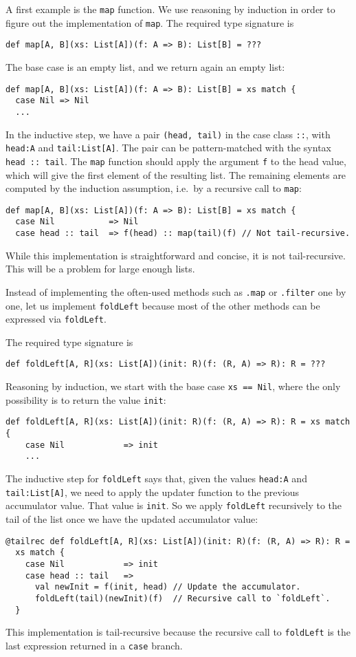 A first example is the \lstinline!map! function. We use reasoning
by induction in order to figure out the implementation of \lstinline!map!.
The required type signature is
\begin{lstlisting}
def map[A, B](xs: List[A])(f: A => B): List[B] = ???
\end{lstlisting}
The base case is an empty list, and we return again an empty list:
\begin{lstlisting}
def map[A, B](xs: List[A])(f: A => B): List[B] = xs match {
  case Nil => Nil
  ...
\end{lstlisting}
In the inductive step, we have a pair \lstinline!(head, tail)! in
the case class \lstinline!::!, with \lstinline!head:A! and \lstinline!tail:List[A]!.
The pair can be pattern-matched with the syntax \lstinline!head :: tail!.
The \lstinline!map! function should apply the argument \lstinline!f!
to the head value, which will give the first element of the resulting
list. The remaining elements are computed by the induction assumption,
i.e.~by a recursive call to \lstinline!map!:
\begin{lstlisting}
def map[A, B](xs: List[A])(f: A => B): List[B] = xs match {
  case Nil           => Nil
  case head :: tail  => f(head) :: map(tail)(f) // Not tail-recursive.
\end{lstlisting}
While this implementation is straightforward and concise, it is not
tail-recursive. This will be a problem for large enough lists.

Instead of implementing the often-used methods such as \lstinline!.map!
or \lstinline!.filter! one by one, let us implement \lstinline!foldLeft!
because most of the other methods can be expressed via \lstinline!foldLeft!. 

The required type signature is
\begin{lstlisting}
def foldLeft[A, R](xs: List[A])(init: R)(f: (R, A) => R): R = ???
\end{lstlisting}
Reasoning by induction, we start with the base case \lstinline!xs == Nil!,
where the only possibility is to return the value \lstinline!init!:
\begin{lstlisting}
def foldLeft[A, R](xs: List[A])(init: R)(f: (R, A) => R): R = xs match {
    case Nil            => init
    ...
\end{lstlisting}
The inductive step for \lstinline!foldLeft! says that, given the
values \lstinline!head:A! and \lstinline!tail:List[A]!, we need
to apply the updater function to the previous accumulator value. That
value is \lstinline!init!. So we apply \lstinline!foldLeft! recursively
to the tail of the list once we have the updated accumulator value:
\begin{lstlisting}
@tailrec def foldLeft[A, R](xs: List[A])(init: R)(f: (R, A) => R): R =
  xs match {
    case Nil            => init
    case head :: tail   => 
      val newInit = f(init, head) // Update the accumulator.
      foldLeft(tail)(newInit)(f)  // Recursive call to `foldLeft`.
  }
\end{lstlisting}
This implementation is tail-recursive because the recursive call to
\lstinline!foldLeft! is the last expression returned in a \lstinline!case!
branch.

